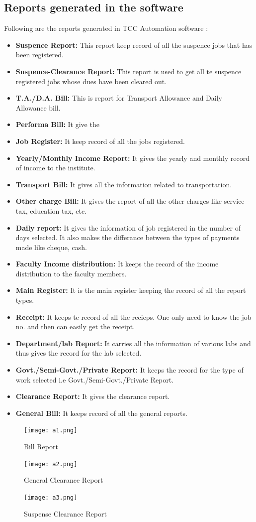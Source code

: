 \subsection{Reports generated in the software}
Following are the reports generated in TCC Automation software :
\begin{itemize}
\item {\bf{ Suspence Report:}} This report keep record of all the suspence jobs that has been registered.
\item {\bf{Suspence-Clearance Report:}} This report is used to get all te suspence registered jobs whose dues have been cleared out.
\item {\bf {T.A./D.A. Bill:}} This is report for Transport Allowance and Daily Allowance bill.
\item {\bf {Performa Bill:}} It give the 
\item {\bf {Job Register:}} It keep record of all the jobs registered.
\item {\bf {Yearly/Monthly Income Report:}} It gives the yearly and monthly record of income to the institute.
\item {\bf {Transport Bill:}} It gives all the information related to transportation.
\item {\bf {Other charge Bill:}} It gives the report of all the other charges like service tax, education tax, etc.
\item {\bf {Daily report:}} It gives the information of job registered in  the number of days selected. It also makes the differance between the types of payments made like cheque, cash.
\item {\bf {Faculty Income distribution:}} It keeps the record of the income distribution to the faculty members.
\item {\bf {Main Register:}} It is the main register keeping the record of all the report types.
\item {\bf {Receipt:}} It keeps te record of all the recieps. One only need to know the job no. and then can easily get the receipt.
\item {\bf {Department/lab Report:}} It carries all the information of various labs and thus gives the record for the lab selected.
\item {\bf {Govt./Semi-Govt./Private Report:}} It keeps the record for the type of work selected i.e Govt./Semi-Govt./Private Report.
\item {\bf {Clearance Report:}} It gives the clearance report.
\item {\bf {General Bill:}} It keeps record of all the general reports.
\end{itemize}
\newpage
\begin{figure}[h]
\centering \texttt{[image: a1.png]}
\caption{Bill Report}
\end{figure}
\newpage
\begin{figure}[h]
\centering \texttt{[image: a2.png]}
\caption{General Clearance Report}
\end{figure}
\newpage
\begin{figure}[h]
\centering \texttt{[image: a3.png]}
\caption{Suspense Clearance Report}
\end{figure}
\newpage


